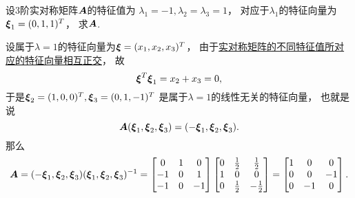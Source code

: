 \begin{example}
设3阶实对称矩阵\(\boldsymbol{A}\)的特征值为
\(\lambda_1=-1,\lambda_2=\lambda_3=1\)，
对应于\(\lambda_1\)的特征向量为\(\boldsymbol{\xi}_1=(0,1,1)^T\)，
求\(\boldsymbol{A}\).
\begin{solution}
设属于\(\lambda=1\)的特征向量为\(\boldsymbol{\xi}=(x_1,x_2,x_3)^T\)，
由于\hyperref[theorem:特征值与特征向量.实对称矩阵2]{实对称矩阵的不同特征值所对应的特征向量相互正交}，
故\begin{equation*}
	\boldsymbol{\xi}^T \boldsymbol{\xi}_1 = x_2+x_3 = 0,
\end{equation*}
于是\(\boldsymbol{\xi}_2=(1,0,0)^T,
\boldsymbol{\xi}_3=(0,1,-1)^T\)
是属于\(\lambda=1\)的线性无关的特征向量，
也就是说\begin{equation*}
	\boldsymbol{A}(\boldsymbol{\xi}_1,\boldsymbol{\xi}_2,\boldsymbol{\xi}_3)
	=(-\boldsymbol{\xi}_1,\boldsymbol{\xi}_2,\boldsymbol{\xi}_3).
\end{equation*}
那么\begin{equation*}
	\boldsymbol{A}
	=(-\boldsymbol{\xi}_1,\boldsymbol{\xi}_2,\boldsymbol{\xi}_3)
	(\boldsymbol{\xi}_1,\boldsymbol{\xi}_2,\boldsymbol{\xi}_3)^{-1}
	=\begin{bmatrix}
		0 & 1 & 0 \\
		-1 & 0 & 1 \\
		-1 & 0 & -1
	\end{bmatrix}
	\begin{bmatrix}
		0 & \frac{1}{2} & \frac{1}{2} \\
		1 & 0 & 0 \\
		0 & \frac{1}{2} & -\frac{1}{2}
	\end{bmatrix}
	=\begin{bmatrix}
		1 & 0 & 0 \\
		0 & 0 & -1 \\
		0 & -1 & 0
	\end{bmatrix}.
\end{equation*}
\end{solution}
\end{example}

